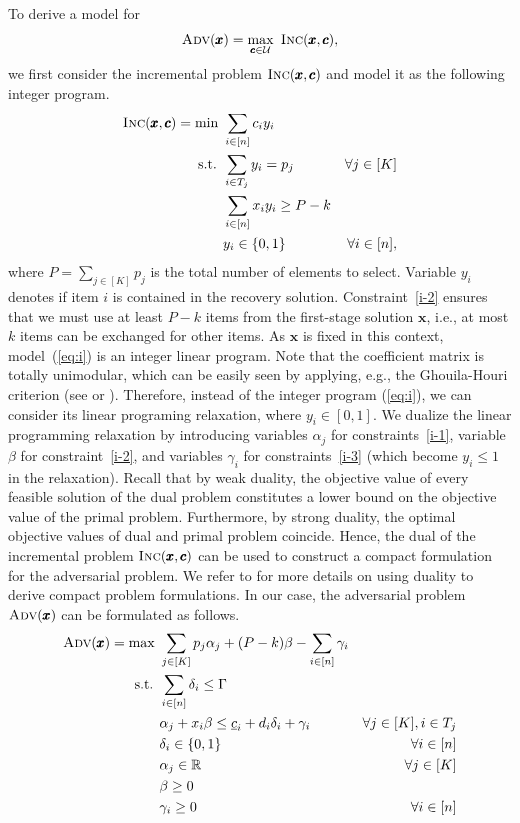 \documentclass[a4paper,11pt,abstracton]{scrartcl}
\theoremstyle{definition}
\theoremstyle{remark}
\newcommand{\rr}{\mathbb{R}}
\newcommand{\cU}{\mathcal{U}}
\begin{document}
To derive a model for 
\[ \textsc{Adv}(\pmb{x}) = \max_{\pmb{c}\in\cU}\ \textsc{Inc}(\pmb{x},\pmb{c}), \]
we first consider the incremental problem {$\textsc{Inc}(\pmb{x},\pmb{c})$} and model it as the following integer program.
\begin{subequations}
\label{eq:i}  
\begin{align}
\textsc{Inc}(\pmb{x},\pmb{c}) = \min\ & \sum_{i\in[n]} c_i y_i \label{i-0} \\
\text{s.t. } & \sum_{i\in T_j} y_i = p_j  & \forall j\in[K] \label{i-1}\\
& \sum_{i\in[n]} x_i y_i \ge P-k \label{i-2}\\
& y_i\in\{0,1\} & \forall i\in[n], \label{i-3}
\end{align}
\end{subequations}
where $P = \sum_{j \in [K]} p_j$ is the total number of elements to select. Variable $y_i$ denotes if item $i$ is contained in the recovery solution. Constraint~\eqref{i-2} ensures that we must use at least $P-k$ items from the first-stage solution $\pmb{x}$, i.e., at most $k$ items can be exchanged for other items. As $\pmb{x}$ is fixed in this context, model~(\ref{eq:i}) is an integer linear program. Note that the coefficient matrix is totally unimodular, which can be easily seen by applying, e.g., the Ghouila-Houri criterion (see \cite{GH62} or \cite[Theorem 5.23]{korte2006combinatorial}). Therefore, instead of the integer program (\ref{eq:i}), we can consider its linear programing relaxation, where $y_i \in [0,1]$. We dualize the linear programming relaxation by introducing variables $\alpha_j$ for constraints~\eqref{i-1}, variable $\beta$ for constraint~\eqref{i-2}, and variables $\gamma_i$ for constraints~\eqref{i-3} (which become $y_i \le 1$ in the relaxation). Recall that by weak duality, the objective value of every feasible solution of the dual problem constitutes a lower bound on the objective value of the primal problem. Furthermore, by strong duality, the optimal objective values of dual and primal problem coincide. Hence, the dual of the incremental problem $\textsc{Inc}(\pmb{x},\pmb{c})$ can be used to construct a compact formulation for the adversarial problem.  We refer to \cite{gorissen2015practical} for more details on using duality to derive compact problem formulations. In our case, the adversarial problem $\textsc{Adv}(\pmb{x})$ can be formulated as follows.
\begin{subequations}
\label{eq:ad}
\begin{align}
\textsc{Adv}(\pmb{x}) = \max\ & \sum_{j\in[K]} p_j \alpha_j + (P-k)\beta - \sum_{i\in[n]} \gamma_i \\
\text{s.t. } & \sum_{i\in[n]} \delta_i \le \Gamma \label{ad-1} \\
& \alpha_j + x_i \beta \le \underline{c}_i + d_i\delta_i + \gamma_i & \forall j\in[K], i\in T_j \label{ad-2}\\
& \delta_i\in\{0,1\} & \forall i\in[n] \label{ad-3}\\
& \alpha_j \in \rr & \forall j\in[K] \\
& \beta \ge 0 \label{ad-4}\\
& \gamma_i \ge 0 & \forall i\in[n] \label{ad-5}
\end{align}
\end{subequations}
\end{document}
